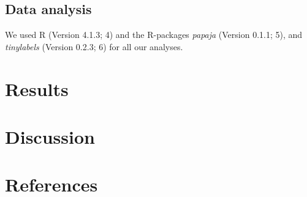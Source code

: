 \documentclass[
  man]{apa6}
\begin{document}
\hypertarget{data-analysis}{%
\subsection{Data analysis}\label{data-analysis}}

We used R (Version 4.1.3; 4) and the R-packages \emph{papaja} (Version 0.1.1; 5), and \emph{tinylabels} (Version 0.2.3; 6) for all our analyses.

\hypertarget{results}{%
\section{Results}\label{results}}

\hypertarget{discussion}{%
\section{Discussion}\label{discussion}}

\newpage

\hypertarget{references}{%
\section{References}\label{references}}
\end{document}
